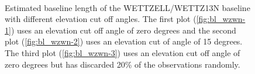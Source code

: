 \documentclass[twoside=semi,fontsize=12pt,paper=a4,titlepage=on]{kv_article}
\begin{document}
\begin{figure}\ContinuedFloat
	 \\
    \caption{Estimated baseline length of the WETTZELL/WETTZ13N baseline with different elevation cut off angles. The first plot (\ref{fig:bl_wzwn-1}) uses an
    elevation cut off angle of zero degrees and the second plot (\ref{fig:bl_wzwn-2}) uses an elevation cut of angle of 15 degrees. The third plot (\ref{fig:bl_wzwn-3})
    uses an elevation cut off angle of zero degrees but has discarded 20\% of the observations randomly.}
	\label{fig:bl_wzwn}
\end{figure}

%  
%
%


%
%

\end{document}
